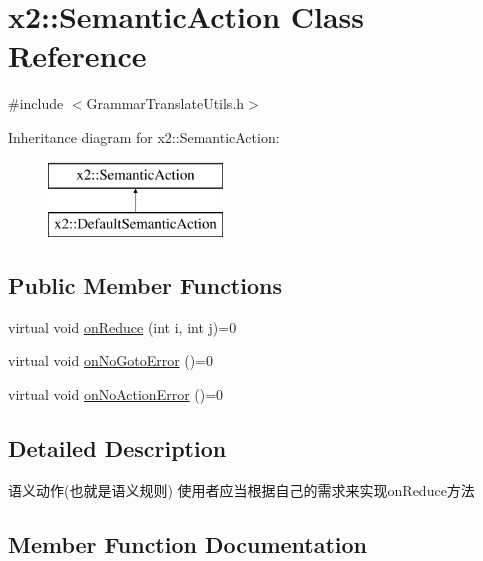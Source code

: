 \hypertarget{classx2_1_1_semantic_action}{}\section{x2\+:\+:Semantic\+Action Class Reference}
\label{classx2_1_1_semantic_action}


{\ttfamily \#include $<$Grammar\+Translate\+Utils.\+h$>$}

Inheritance diagram for x2\+:\+:Semantic\+Action\+:\begin{figure}[H]
\begin{center}
\leavevmode
\includegraphics[height=2.000000cm]{classx2_1_1_semantic_action}
\end{center}
\end{figure}
\subsection*{Public Member Functions}
\begin{DoxyCompactItemize}
\item 
virtual void \hyperlink{classx2_1_1_semantic_action_a859c5de657a2c684fef66e04a324e980}{on\+Reduce} (int i, int j)=0
\item 
virtual void \hyperlink{classx2_1_1_semantic_action_a00d94c579c5962c74ccd5ee6bc9ef70c}{on\+No\+Goto\+Error} ()=0
\item 
virtual void \hyperlink{classx2_1_1_semantic_action_ac8afb7342d18d7d633c234047b16fe27}{on\+No\+Action\+Error} ()=0
\end{DoxyCompactItemize}


\subsection{Detailed Description}
语义动作(也就是语义规则) 使用者应当根据自己的需求来实现on\+Reduce方法 

\subsection{Member Function Documentation}
\mbox{\label{classx2_1_1_semantic_action_ac8afb7342d18d7d633c234047b16fe27}} 
